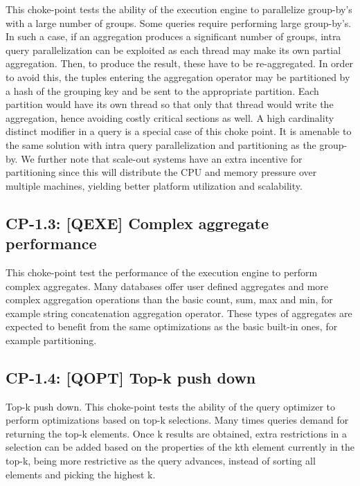 This choke-point tests the ability of the execution engine to parallelize group-by's with a large number of groups. Some queries require performing large group-by's.
In such a case, if an aggregation produces a significant number of groups, intra query parallelization can be exploited as each thread may make its own partial aggregation.
Then, to produce the result, these have to be re-aggregated. In order to avoid this, the tuples entering the aggregation operator may be partitioned by a hash of the grouping key and be sent to the appropriate partition.
Each partition would have its own thread so that only that thread would write the aggregation, hence avoiding costly critical sections as well. A high cardinality distinct modifier in a query is a special case of this choke point.
It is amenable to the same solution with intra query parallelization and partitioning as the group-by.
We further note that scale-out systems have an extra incentive for partitioning since this will distribute the CPU and memory pressure over multiple machines, yielding better platform utilization and scalability.



\subsection*{CP-1.3: [QEXE] Complex aggregate performance}
\label{choke_point_1.3}

This choke-point test the performance of the execution engine to perform complex aggregates. Many databases offer user defined aggregates and more complex aggregation operations than the basic count, sum, max and min, for example string concatenation aggregation operator. These types of aggregates are expected to benefit from the same optimizations as the basic built-in ones, for example partitioning.



\subsection*{CP-1.4: [QOPT] Top-k push down}
\label{choke_point_1.4}

Top-k push down. This choke-point tests the ability of the query optimizer to perform optimizations based on top-k selections. Many times queries demand for returning the top-k elements.
Once k results are obtained, extra restrictions in a selection can be added based on the properties of the kth element currently in the top-k, being more restrictive as the query advances, instead of sorting all elements and picking the highest k.

